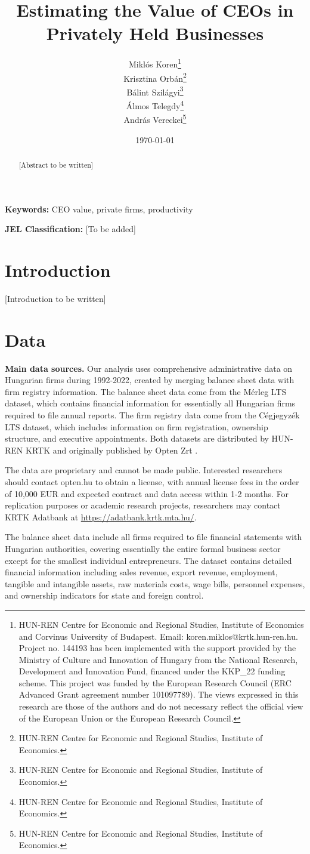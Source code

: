 \documentclass[11pt,a4paper]{article}
\title{Estimating the Value of CEOs in Privately Held Businesses}
\author{Miklós Koren\thanks{HUN-REN Centre for Economic and Regional Studies, Institute of Economics and Corvinus University of Budapest. Email: koren.miklos@krtk.hun-ren.hu. Project no. 144193 has been implemented with the support provided by the Ministry of Culture and Innovation of Hungary from the National Research, Development and Innovation Fund, financed under the KKP\_22 funding scheme. This project was funded by the European Research Council (ERC Advanced Grant agreement number 101097789). The views expressed in this research are those of the authors and do not necessary reflect the official view of the European Union or the European Research Council.} \\
        Krisztina Orbán\thanks{HUN-REN Centre for Economic and Regional Studies, Institute of Economics.} \\
        Bálint Szilágyi\thanks{HUN-REN Centre for Economic and Regional Studies, Institute of Economics.} \\
        Álmos Telegdy\thanks{HUN-REN Centre for Economic and Regional Studies, Institute of Economics.} \\
        András Vereckei\thanks{HUN-REN Centre for Economic and Regional Studies, Institute of Economics.}}
\date{\today}
\begin{document}
\maketitle

\begin{abstract}
[Abstract to be written]
\end{abstract}

\textbf{Keywords:} CEO value, private firms, productivity

\textbf{JEL Classification:} [To be added]

\newpage

\section{Introduction}

[Introduction to be written]

\section{Data}

\textbf{Main data sources.} Our analysis uses comprehensive administrative data on Hungarian firms during 1992-2022, created by merging balance sheet data with firm registry information. The balance sheet data come from the Mérleg LTS dataset, which contains financial information for essentially all Hungarian firms required to file annual reports. The firm registry data come from the Cégjegyzék LTS dataset, which includes information on firm registration, ownership structure, and executive appointments. Both datasets are distributed by HUN-REN KRTK and originally published by Opten Zrt \citep{merleg2024,cegjegyzek2024}.

The data are proprietary and cannot be made public. Interested researchers should contact opten.hu to obtain a license, with annual license fees in the order of 10,000 EUR and expected contract and data access within 1-2 months. For replication purposes or academic research projects, researchers may contact KRTK Adatbank at \url{https://adatbank.krtk.mta.hu/}.

The balance sheet data include all firms required to file financial statements with Hungarian authorities, covering essentially the entire formal business sector except for the smallest individual entrepreneurs. The dataset contains detailed financial information including sales revenue, export revenue, employment, tangible and intangible assets, raw materials costs, wage bills, personnel expenses, and ownership indicators for state and foreign control.
\end{document}
